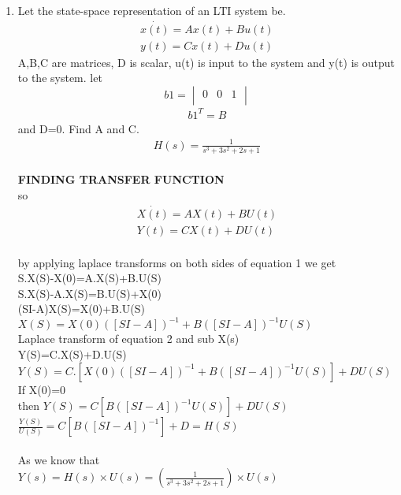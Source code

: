 \begin{enumerate}[label=\thesection.\arabic*.,ref=\thesection.\theenumi]
\item Let the state-space representation of an LTI system be.
\begin{align*}
 \dot{x(t)}=Ax(t)+Bu(t) \\
 y(t)=Cx(t)+Du(t)
\end{align*}
A,B,C are matrices, D is scalar, u(t) is input to the system and y(t) is output to the system. let
\begin{equation}
 b1 =\begin{vmatrix}
  0&0&1\\
 \end{vmatrix}
\end{equation}
\begin{align}
b1^T=B
\end{align}
and D=0. Find A and C.
\begin{align}
H(s)=\frac{1}{s^3+3s^2+2s+1}
\end{align}
\solution
\\ \textbf{FINDING TRANSFER FUNCTION}
\\so
\begin{align*}
 \dot{X(t)}=AX(t)+BU(t) \\
 Y(t)=CX(t)+DU(t)
\end{align*}    
\\by applying laplace transforms on both sides of equation 1
we get
\\S.X(S)-X(0)=A.X(S)+B.U(S)
\\S.X(S)-A.X(S)=B.U(S)+X(0)
\\(SI-A)X(S)=X(0)+B.U(S)
\\$X(S)=X(0)([SI-A])^{-1}+ B([SI-A])^{-1}U(S)$
\\Laplace transform of equation 2 and sub X(s) 
\\Y(S)=C.X(S)+D.U(S)
\\$Y(S)=C.[X(0)([SI-A])^{-1 }+ B([SI-A])^{-1}U(S)]+DU(S)$
\\If X(0)=0
\\then $Y(S)=C[B([SI-A])^{-1}U(S)]+DU(S)$
\\$\frac{Y(S)}{U(S)}=C[B([SI-A])^{-1}]+D=H(S)$
\\
\\ As we know that
\\ $Y(s)=H(s) \times U(s)= (\frac{1}{s^3+3s^2+2s+1}) \times U(s) $

\end{enumerate}
